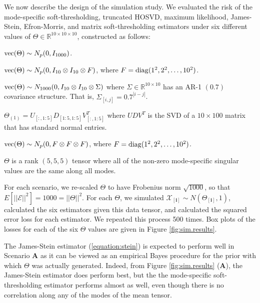 We now describe the design of the simulation study. We evaluated the
risk of the mode-specific soft-thresholding, truncated HOSVD, maximum
likelihood, James-Stein, Efron-Morris, and matrix soft-thresholding
estimators under six different values of $\Theta \in \mathbb{R}^{10
  \times 10 \times 10}$, constructed as follows:
\begin{description}[noitemsep]
\item[A.] $\operatorname*{vec}(\Theta) \sim N_p(0,I_{1000})$.
\item[B.] $\operatorname*{vec}(\Theta) \sim N_p(0,I_{10} \otimes I_{10} \otimes F)$, where $F =
  \operatorname*{diag}(1^2,2^2,\ldots,10^2)$.
\item[C.] $\operatorname*{vec}(\Theta) \sim N_{1000}(0,I_{10}\otimes I_{10}\otimes \Sigma)$ where
  $\Sigma \in \mathbb{R}^{10\times 10}$ has an AR-1 $(0.7)$ covariance structure. That is,
  $\Sigma_{[i,j]} = 0.7^{|i - j|}$.
\item[D.] $\Theta_{(1)} = U_{[:,1:5]}D_{[1:5,1:5]}V_{[:,1:5]}^T$ where
  $UDV^T$ is the SVD of a $10 \times 100$ matrix that has standard
  normal entries.
\item[E.] $\operatorname*{vec}(\Theta) \sim N_p(0,F \otimes F \otimes F)$, where $F =
  \operatorname*{diag}(1^2,2^2,\ldots,10^2)$.
\item[F.] $\Theta$ is a rank $(5,5,5)$ tensor where all of the non-zero mode-specific
  singular values are the same along all modes.
\end{description}
For each scenario, we re-scaled $\Theta$ to have Frobenius norm
$\sqrt{1000}$, so that $E[||\mathcal{E}||^2] = 1000 =
||\Theta||^2$. For each $\Theta$, we simulated
$\mathcal{X}_{[\mathbf{i}]} \sim N(\Theta_{[\mathbf{i}]},1)$,
calculated the six estimators given this data tensor, and calculated
the squared error loss for each estimator. We repeated this process
500 times. Box plots of the losses for each of the six $\Theta$ values
are given in Figure \ref{fig:sim.results}.

The James-Stein estimator (\ref{equation:stein}) is expected to
perform well in Scenario \textbf{A} as it can be viewed as an
empirical Bayes procedure for the prior with which $\Theta$ was
actually generated.
Indeed, from Figure \ref{fig:sim.results} (\textbf{A}), the
James-Stein estimator does perform best, but the the mode-specific
soft-thresholding estimator performs almost as well, even though there
is no correlation along any of the modes of the mean tensor.

